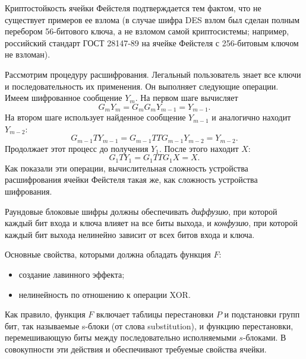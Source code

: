 Криптостойкость ячейки Фейстеля подтверждается тем фактом, что не существует примеров ее взлома (в случае шифра DES взлом был сделан полным перебором 56-битового ключа, а не взломом самой криптосистемы; например, российский стандарт ГОСТ 28147-89 на ячейке Фейстеля с 256-битовым ключом не взломан).

Рассмотрим процедуру расшифрования. Легальный пользователь знает все ключи и последовательность их применения. Он выполняет следующие операции. Имеем шифрованное сообщение $Y_{m}$. На первом шаге вычисляет
\[
    G_{m} Y_{m} = G_{m} G_{m} Y_{m-1} = Y_{m-1}.
\]
На втором шаге использует найденное сообщение $Y_{m-1}$ и аналогично находит $Y_{m-2}$:
\[
    G_{m-1} T Y_{m-1} = G_{m-1} T T G_{m-1} Y_{m-2} = Y_{m-2}.
\]
Продолжает этот процесс до получения $Y_{1}$. После этого находит $X$:
\[
    G_{1} T Y_{1} = G_{1} T T G_{1} X = X.
\]
Как показали эти операции, вычислительная сложность устройства расшифрования ячейки Фейстеля такая же, как сложность устройства шифрования.

Раундовые блоковые шифры должны обеспечивать \emph{диффузию}, при которой каждый бит входа и ключа влияет на все биты выхода, и \emph{конфузию}, при которой каждый бит выхода нелинейно зависит от всех битов входа и ключа.

Основные свойства, которыми должна обладать функция $F$:
\begin{itemize}
    \item создание лавинного эффекта;
    \item нелинейность по отношению к операции XOR.
\end{itemize}

Как правило, функция $F$ включает таблицы перестановки $P$ и подстановки групп бит, так называемые s-блоки (от слова substitution), и функцию перестановки, перемешивающую биты между последовательно исполняемыми $s$-блоками. В совокупности эти действия и обеспечивают требуемые свойства ячейки.
